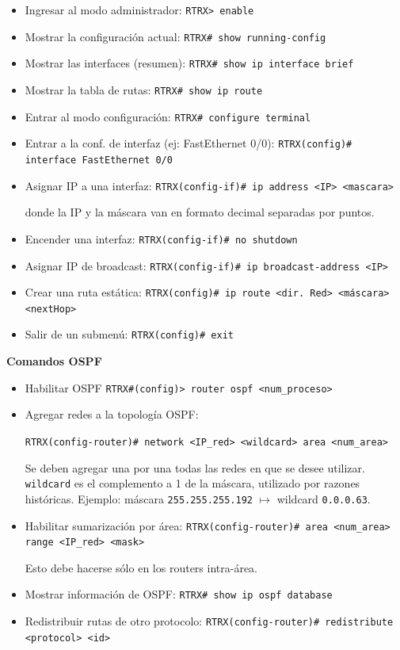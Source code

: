 \documentclass[a4paper,10pt]{article}
\begin{document}
\begin{itemize}
    \item Ingresar al modo administrador:
\texttt{RTRX> enable}
    \item Mostrar la configuración actual: \texttt{RTRX# show running-config}
    \item Mostrar las interfaces (resumen): \texttt{RTRX# show ip interface brief}
    \item Mostrar la tabla de rutas: \texttt{RTRX# show ip route}
    \item Entrar al modo configuración: \texttt{RTRX# configure terminal}
    \item Entrar a la conf. de interfaz (ej: FastEthernet 0/0): \texttt{RTRX(config)# interface FastEthernet 0/0}
    \item Asignar IP a una interfaz: \texttt{RTRX(config-if)# ip address <IP> <mascara>}
    
    donde la IP y la máscara van en formato decimal separadas por puntos.
    \item Encender una interfaz: \texttt{RTRX(config-if)# no shutdown}
    \item Asignar IP de broadcast: \texttt{RTRX(config-if)# ip broadcast-address <IP>}
    \item Crear una ruta estática: \texttt{RTRX(config)# ip route <dir. Red> <máscara> <nextHop>}
    \item Salir de un submenú: \texttt{RTRX(config)# exit}

\end{itemize}

\textbf{Comandos OSPF}

\begin{itemize}
    \item Habilitar OSPF \texttt{RTRX#(config)> router ospf <num_proceso>}
    \item Agregar redes a la topología OSPF: 
    
    \texttt{RTRX(config-router)# network <IP_red> <wildcard> area <num_area>}
    
    Se deben agregar una por una todas las redes en que se desee utilizar. \texttt{wildcard} es el complemento a 1 de la máscara, utilizado por razones históricas. Ejemplo: máscara \texttt{255.255.255.192} $\mapsto$ wildcard \texttt{0.0.0.63}.

    \item Habilitar sumarización por área: \texttt{RTRX(config-router)# area <num_area> range <IP_red> <mask>}
    
    Esto debe hacerse sólo en los routers intra-área.

    \item Mostrar información de OSPF: \texttt{RTRX# show ip ospf database}
    
    \item Redistribuir rutas de otro protocolo: \texttt{RTRX(config-router)# redistribute <protocol> <id>}
    
\end{itemize}
\end{document}
